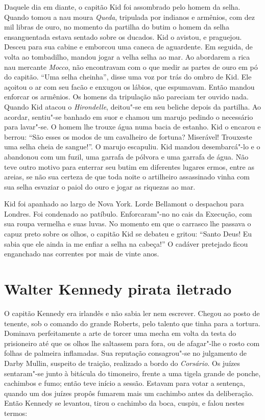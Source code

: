 Daquele dia em diante, o capitão Kid foi assombrado pelo homem da selha.
Quando tomou a nau moura \textit{Queda}, tripulada por indianos e
armênios, com dez mil libras de ouro, no momento da partilha do butim o
homem da selha ensanguentada estava sentado sobre os ducados. Kid o
avistou, e praguejou. Desceu para sua cabine e emborcou uma caneca de
aguardente. Em seguida, de volta ao tombadilho, mandou jogar a velha selha
ao mar. Ao abordarem a rica nau mercante \textit{Mocco}, não encontravam
com o que medir as partes de ouro em pó do capitão. “Uma selha cheinha”,
disse uma voz por trás do ombro de Kid. Ele açoitou o ar com seu facão e
enxugou os lábios, que espumavam. Então mandou enforcar os armênios. Os
homens da tripulação não pareciam ter ouvido nada. Quando Kid atacou o
\textit{Hirondelle}, deitou"-se em seu beliche depois da partilha. Ao
acordar, sentiu"-se banhado em suor e chamou um marujo pedindo o necessário
para lavar"-se. O homem lhe trouxe água numa bacia de estanho. Kid o
encarou e berrou: “São esses os modos de um cavalheiro de fortuna?
Miserável! Trouxeste uma selha cheia de sangue!”. O marujo escapuliu. Kid
mandou desembarcá"-lo e o abandonou com um fuzil, uma garrafa de pólvora e
uma garrafa de água. Não teve outro motivo para enterrar seu butim em
diferentes lugares ermos, entre as areias, se não sua certeza de que toda
noite o artilheiro assassinado vinha com sua selha esvaziar o paiol do
ouro e jogar as riquezas ao mar.

Kid foi apanhado ao largo de Nova York. Lorde Bellamont o despachou para
Londres. Foi condenado ao patíbulo. Enforcaram"-no no cais da Execução, com
sua roupa vermelha e suas luvas. No momento em que o carrasco lhe passava
o capuz preto sobre os olhos, o capitão Kid se debateu e gritou: “Santo
Deus! Eu sabia que ele ainda ia me enfiar a selha na cabeça!” O cadáver
pretejado ficou enganchado nas correntes por mais de vinte anos.

\chapter{Walter Kennedy pirata iletrado}

O capitão Kennedy era irlandês e não sabia ler nem escrever. Chegou ao
posto de tenente, sob o comando do grande Roberts, pelo talento que tinha
para a tortura. Dominava perfeitamente a arte de torcer uma mecha em volta
da testa do prisioneiro até que os olhos lhe saltassem para fora, ou de
afagar"-lhe o rosto com folhas de palmeira inflamadas. Sua reputação
consagrou"-se no julgamento de Darby Mullin, suspeito de traição, realizado
a bordo do \textit{Corsário}. Os juízes sentaram"-se junto à bitácula do
timoneiro, frente a uma tigela grande de ponche, cachimbos e fumo; então
teve início a sessão. Estavam para votar a sentença, quando um dos juízes
propôs fumarem mais um cachimbo antes da deliberação. Então Kennedy se
levantou, tirou o cachimbo da boca, cuspiu, e falou nestes termos:

